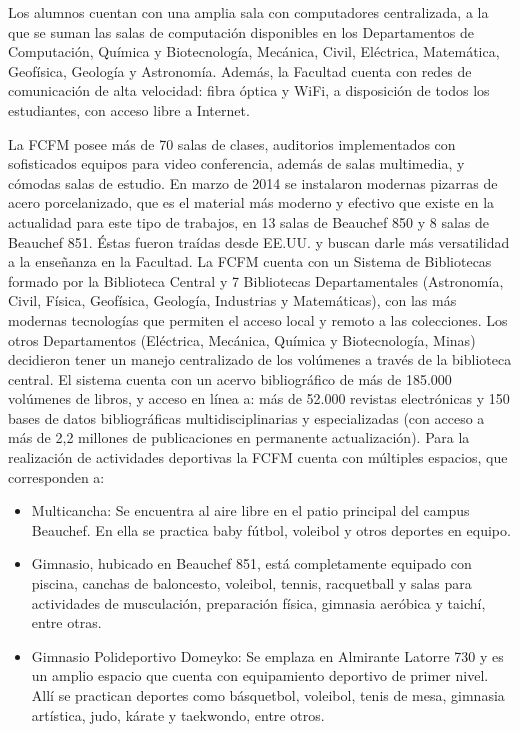 Los alumnos cuentan con una amplia sala con computadores centralizada, a la que se suman las
salas de computación disponibles en los Departamentos de Computación, Química y Biotecnología,
Mecánica, Civil, Eléctrica, Matemática, Geofísica, Geología y Astronomía.
Además, la Facultad cuenta con redes de comunicación de alta velocidad: fibra óptica y WiFi,
a disposición de todos los estudiantes, con acceso libre a Internet.

La FCFM posee más de 70 salas de clases, auditorios implementados con sofisticados equipos
para video conferencia, además de salas multimedia, y cómodas salas de estudio. En marzo de
2014 se instalaron modernas pizarras de acero porcelanizado, que es el material más moderno y
efectivo que existe en la actualidad para este tipo de trabajos, en 13 salas de Beauchef 850 y 8 salas
de Beauchef 851. Éstas fueron traídas desde EE.UU. y buscan darle más versatilidad a la enseñanza
en la Facultad.
La FCFM cuenta con un Sistema de Bibliotecas formado por la Biblioteca Central y
7 Bibliotecas Departamentales (Astronomía, Civil, Física, Geofísica, Geología, Industrias y
Matemáticas), con las más modernas tecnologías que permiten el acceso local y remoto a las
colecciones. Los otros Departamentos (Eléctrica, Mecánica, Química y Biotecnología, Minas)
decidieron tener un manejo centralizado de los volúmenes a través de la biblioteca central. El
sistema cuenta con un acervo bibliográfico de más de 185.000 volúmenes de libros, y acceso en
línea a: más de 52.000 revistas electrónicas y 150 bases de datos bibliográficas multidisciplinarias
y especializadas (con acceso a más de 2,2 millones de publicaciones en permanente actualización).
Para la realización de actividades deportivas la FCFM cuenta con múltiples espacios, que
corresponden a:

\begin{itemize}
\item Multicancha: Se encuentra al aire libre en el patio principal del campus Beauchef. En ella se
practica baby fútbol, voleibol y otros deportes en equipo.
\item Gimnasio, hubicado en Beauchef 851, está completamente
equipado con piscina, canchas de baloncesto, voleibol, tennis, racquetball y 
salas para actividades de musculación, preparación física, gimnasia aeróbica y taichí,
entre otras. 
\item Gimnasio Polideportivo Domeyko: Se emplaza en Almirante Latorre 730 y es un amplio
espacio que cuenta con equipamiento deportivo de primer nivel. Allí se practican deportes
como básquetbol, voleibol, tenis de mesa, gimnasia artística, judo, kárate y taekwondo, entre
otros.
\end{itemize}

